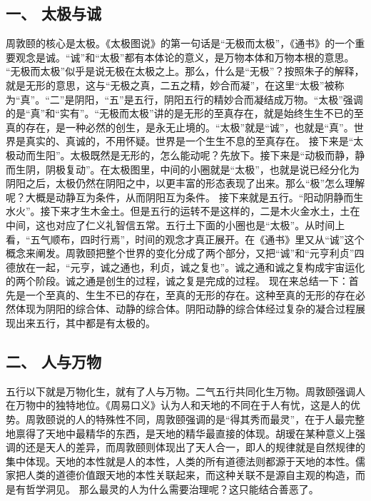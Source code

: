 \documentclass{article}
\begin{document}
\subsection{一、	太极与诚}
周敦颐的核心是太极。《太极图说》的第一句话是“无极而太极”，《通书》的一个重要观念是诚。“诚”和“太极”都有本体论的意义，是万物本体和万物本根的意思。
“无极而太极”似乎是说无极在太极之上。那么，什么是“无极”？按照朱子的解释，就是无形的意思，这与“无极之真，二五之精，妙合而凝”，在这里“太极”被称为“真”。“二”是阴阳，“五”是五行，阴阳五行的精妙合而凝结成万物。“太极”强调的是“真”和“实有”。“无极而太极”讲的是无形的至真存在，就是始终生生不已的至真的存在，是一种必然的创生，是永无止境的。“太极”就是“诚”，也就是“真”。世界是真实的、真诚的，不用怀疑。世界是一个生生不息的至真存在。
接下来是“太极动而生阳”。太极既然是无形的，怎么能动呢？先放下。接下来是“动极而静，静而生阴，阴极复动”。在太极图里，中间的小圈就是“太极”，也就是说已经分化为阴阳之后，太极仍然在阴阳之中，以更丰富的形态表现了出来。那么“极”怎么理解呢？大概是动静互为条件，从而阴阳互为条件。
接下来就是五行。“阳动阴静而生水火”。接下来才生木金土。但是五行的运转不是这样的，二是木火金水土，土在中间，这也对应了仁义礼智信五常。五行土下面的小圈也是“太极”。从时间上看，“五气顺布，四时行焉”，时间的观念才真正展开。在《通书》里又从“诚”这个概念来阐发。周敦颐把整个世界的变化分成了两个部分，又把“诚”和“元亨利贞”四德放在一起，“元亨，诚之通也，利贞，诚之复也”。诚之通和诚之复构成宇宙运化的两个阶段。诚之通是创生的过程，诚之复是完成的过程。
现在来总结一下：首先是一个至真的、生生不已的存在，至真的无形的存在。这种至真的无形的存在必然体现为阴阳的综合体、动静的综合体。阴阳动静的综合体经过复杂的凝合过程展现出来五行，其中都是有太极的。
\subsection{二、	人与万物}
五行以下就是万物化生，就有了人与万物。二气五行共同化生万物。周敦颐强调人在万物中的独特地位。《周易口义》认为人和天地的不同在于人有忧，这是人的优势。周敦颐说的人的特殊性不同，周敦颐强调的是“得其秀而最灵”，在于人最完整地禀得了天地中最精华的东西，是天地的精华最直接的体现。胡瑷在某种意义上强调的还是天人的差异，而周敦颐则体现出了天人合一，即人的规律就是自然规律的集中体现。天地的本性就是人的本性，人类的所有道德法则都源于天地的本性。儒家把人类的道德价值跟天地的本性关联起来，而这种关联不是源自主观的构造，而是有哲学洞见。
那么最灵的人为什么需要治理呢？这只能结合善恶了。
\end{document}

